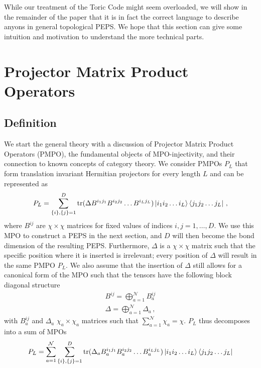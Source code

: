 \documentclass[12 pt]{article}
\begin{document}
While our treatment of the Toric Code might seem overloaded, we will show in the remainder of the paper that it is in fact the correct language to describe anyons in general topological PEPS. We hope that this section can give some intuition and motivation to understand the more technical parts. 

\section{Projector Matrix Product Operators} \label{sec:MPO}
\vspace{3 mm}
\subsection{Definition}
\vspace{5 mm}
We start the general theory with a discussion of Projector Matrix Product Operators (PMPO), the fundamental objects of MPO-injectivity, and their connection to known concepts of category theory. We consider PMPOs $P_L$ that form translation invariant Hermitian projectors for every length $L$ and can be represented as
\begin{equation} \label{mpo}
P_L =\sum_{\{i\}, \{j\} = 1}^{D}\text{tr}(\Delta B^{i_1j_1}B^{i_2j_2}\dots B^{i_Lj_L})\ket{i_1 i_2\dots i_L}\bra{j_1 j_2 \dots j_L}\, ,
\end{equation}
where $B^{ij}$ are $\chi \times \chi$ matrices for fixed values of indices $i,j=1,\ldots,D$. We use this MPO to construct a PEPS in the next section, and $D$ will then become the bond dimension of the resulting PEPS. Furthermore, $\Delta$ is a $\chi \times \chi$ matrix such that the specific position where it is inserted is irrelevant; every position of $\Delta$ will result in the same PMPO $P_L$. We also assume that the insertion of $\Delta$ still allows for a canonical form of the MPO such that the tensors have the following block diagonal structure \cite{MPSrepresentations}
\begin{align}
B^{ij} = \bigoplus_{a = 1}^{\mathcal{N}} B_a^{ij}\\
\Delta = \bigoplus_{a = 1}^{\mathcal{N}} \Delta_a\, ,
\end{align}
with $B_a^{ij}$ and $\Delta_a$ $\chi_a \times \chi_a$ matrices such that $\sum_{a = 1}^{\mathcal{N}} \chi_a = \chi$. $P_L$ thus decomposes into a sum of MPOs
\begin{equation}
P_L =\sum_{a = 1}^{\mathcal{N}}\sum_{\{i\}, \{j\} = 1}^{D}\text{tr}(\Delta_a B_a^{i_1j_1}B_a^{i_2j_2}\dots B_a^{i_Lj_L})  \ket{i_1 i_2\dots i_L}\bra{j_1 j_2 \dots j_L}
\end{equation}
\end{document}
